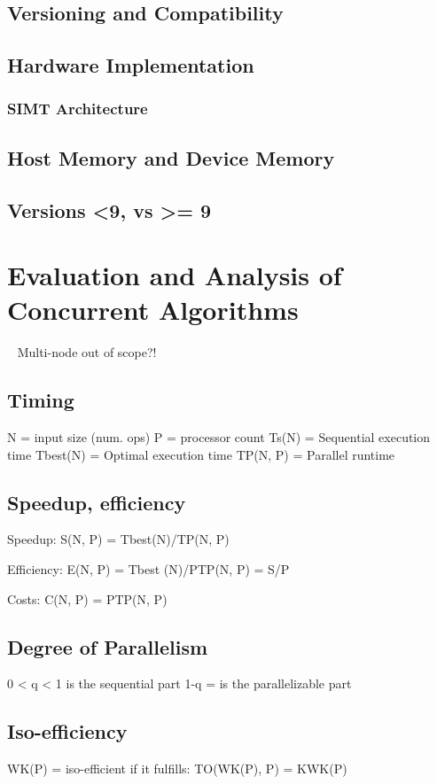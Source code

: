 \subsection{Versioning and Compatibility}%
\subsection{Hardware Implementation}%
\subsubsection{SIMT Architecture}%
\subsection{Host Memory and Device Memory}
\subsection{Versions <9, vs >= 9}
%
%
%
%
%
\section{Evaluation and Analysis of Concurrent Algorithms}~\cite[p.~330]{Lang17}
Multi-node out of scope?!
%
\subsection{Timing}
	N = input size (num. ops)
	P = processor count
	Ts(N) = Sequential execution time
	Tbest(N) = Optimal execution time
	TP(N, P) = Parallel runtime
%
\subsection{Speedup, efficiency}
	Speedup:
S(N, P) = Tbest(N)/TP(N, P)

	Efficiency:
E(N, P) = Tbest (N)/PTP(N, P) = S/P

	Costs:
C(N, P) = PTP(N, P)
%
\subsection{Degree of Parallelism}
	0 < q < 1 is the sequential part
	1-q = is the parallelizable part
%
\subsection{Iso-efficiency}
	WK(P) = iso-efficient if it fulfills:
	TO(WK(P), P) = KWK(P)~\cite[p.~350]{Lang17}
%
